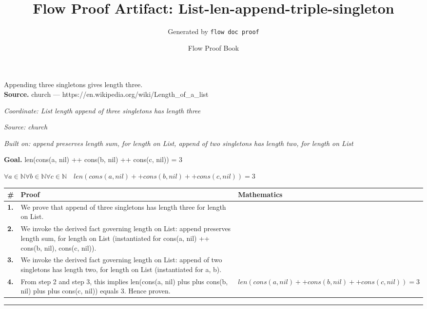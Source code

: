 \documentclass[11pt]{article}
\title{Flow Proof Artifact: List-len-append-triple-singleton}
\author{Generated by \texttt{flow doc proof}}
\date{Flow Proof Book}
\theoremstyle{definition}
\begin{document}
\maketitle
Appending three singletons gives length three.\\[0.5em]
\textbf{Source.} church — https://en.wikipedia.org/wiki/Length\_of\_a\_list\\[0.5em]
\bigskip
{}\par
\smallskip\noindent\textit{Coordinate: List \cdot length \cdot append of three singletons has length three}\par
\smallskip\noindent\textit{Source: church}\par
\smallskip\noindent\textit{Built on: append preserves length sum, for length on List, append of two singletons has length two, for length on List}\par
\medskip
\noindent\textbf{Goal.} len(cons(a, nil) ++ cons(b, nil) ++ cons(c, nil)) = 3\par
\noindent$\displaystyle \forall a \in \mathbb{N} \forall b \in \mathbb{N} \forall c \in \mathbb{N}\quad len(cons(a, nil) ++ cons(b, nil) ++ cons(c, nil)) = 3$\par
\medskip
\noindent
\begin{tabular}{@{} >{\raggedright\arraybackslash}p{} >{\raggedright\arraybackslash}p{} >{\raggedleft\arraybackslash}p{} @{}}
\textbf{\#} & \textbf{Proof} & \textbf{Mathematics} \\
\midrule
\textbf{1.} & We prove that append of three singletons has length three for length on List. & \\[0.45em]
\textbf{2.} & We invoke the derived fact governing length on List: append preserves length sum, for length on List (instantiated for cons(a, nil) ++ cons(b, nil), cons(c, nil)). & \\[0.45em]
\textbf{3.} & We invoke the derived fact governing length on List: append of two singletons has length two, for length on List (instantiated for a, b). & \\[0.45em]
\textbf{4.} & From step 2 and step 3, this implies len(cons(a, nil) plus plus cons(b, nil) plus plus cons(c, nil)) equals 3. Hence proven. & $\displaystyle len(cons(a, nil) ++ cons(b, nil) ++ cons(c, nil)) = 3$ \\[0.45em]
\bottomrule
\end{tabular}
\label{thm:List-length-append_of_three_singletons_has_length_three}
\par\medskip\hrule
\end{document}
